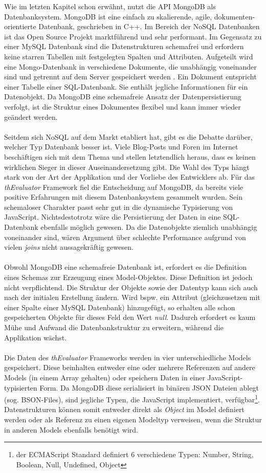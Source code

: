 Wie im letzten Kapitel schon erwähnt, nutzt die API MongoDB als Datenbanksystem. MongoDB ist eine einfach zu skalierende, agile, dokumenten-orientierte Datenbank, geschrieben in C++. Im Bereich der NoSQL Datenbanken ist das Open Source Projekt marktführend und sehr performant. Im Gegensatz zu einer MySQL Datenbank sind die Datenstrukturen schemafrei und erfordern keine starren Tabellen mit festgelegten Spalten und Attributen. Aufgeteilt wird eine Mongo-Datenbank in verschiedene Dokumente, die unabhängig voneinander sind und getrennt auf dem Server gespeichert werden \cite{nosql}. Ein Dokument entspricht einer Tabelle einer SQL-Datenbank. Sie enthält jegliche Informationen für ein Datenobjekt. Da MongoDB eine schemafreie Ansatz der Datenpersistierung verfolgt, ist die Struktur eines Dokumentes flexibel und kann immer wieder geändert werden.\\
\\
Seitdem sich NoSQL auf dem Markt etabliert hat, gibt es die Debatte darüber, welcher Typ Datenbank besser ist. Viele Blog-Posts und Foren im Internet beschäftigen sich mit dem Thema und stellen letztendlich heraus, dass es keinen wirklichen Sieger in dieser Auseinandersetzung gibt. Die Wahl des Typs hängt stark von der Art der Applikation und der Vorliebe des Entwicklers ab. Für das \textit{thEvaluator} Framework fiel die Entscheidung auf MongoDB, da bereits viele positive Erfahrungen mit diesem Datenbanksystem gesammelt wurden. Sein schemaloser Charakter passt sehr gut in die dynamische Typisierung von JavaScript. Nichtsdestotrotz wäre die Persistierung der Daten in eine SQL-Datenbank ebenfalls möglich gewesen. Da die Datenobjekte ziemlich unabhängig voneinander sind, wären Argument über schlechte Performance aufgrund von vielen \textit{joins} nicht aussagekräftig gewesen.\\
\\
Obwohl MongoDB eine schemafreie Datenbank ist, erfordert es die Definition eines Schemas zur Erzeugung eines Model-Objektes. Diese Definition ist jedoch nicht verpflichtend. Die Struktur der Objekte sowie der Datentyp kann sich auch nach der initialen Erstellung ändern. Wird bspw. ein Attribut (gleichzusetzen mit einer Spalte einer MySQL Datenbank) hinzugefügt, so erhalten alle schon gespeicherten Objekte für dieses Feld den Wert \textit{null}. Dadurch erfordert es kaum Mühe und Aufwand die Datenbankstruktur zu erweitern, während die Applikation wächst.\\
\\
Die Daten des \textit{thEvaluator} Frameworks werden in vier unterschiedliche Models gespeichert. Diese beinhalten entweder eine oder mehrere Referenzen auf andere Models (in einem Array gehalten) oder speichern Daten in einer JavaScript-typisierten Form. Da MongoDB diese serialisiert in binären JSON Dateien ablegt (sog. BSON-Files), sind jegliche Typen, die JavaScript implementiert, verfügbar\footnote{der ECMAScript Standard definiert 6 verschiedene Typen: Number, String, Boolean, Null, Undefined, Object}. Datenstrukturen können somit entweder direkt als \textit{Object} im Model definiert werden oder als Referenz zu einen eigenen Modeltyp verweisen, wenn die Struktur in anderen Models ebenfalls benötigt wird.

